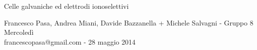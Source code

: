 \documentclass[11pt, twoside, a4paper]{article}
\begin{document}
\begin{center}

        {\huge Celle galvaniche ed elettrodi ionoselettivi}
    \vspace{0.1cm}

      	{Francesco Pasa, Andrea Miani, Davide Bazzanella + Michele Salvagni - Gruppo 8 Mercoledì} \\
      	{francescopasa@gmail.com - 28 maggio 2014}
    \vspace{-0.2cm}

\end{center}






\end{document}
